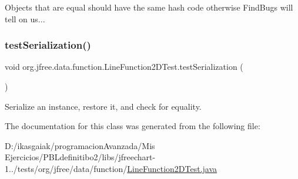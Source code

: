 Objects that are equal should have the same hash code otherwise Find\+Bugs will tell on us... \mbox{\label{classorg_1_1jfree_1_1data_1_1function_1_1_line_function2_d_test_a3b86dd173dec5104c02378b6553208ac}} 
\subsubsection{\texorpdfstring{test\+Serialization()}{testSerialization()}}
{\footnotesize\ttfamily void org.\+jfree.\+data.\+function.\+Line\+Function2\+D\+Test.\+test\+Serialization (\begin{DoxyParamCaption}{ }\end{DoxyParamCaption})}

Serialize an instance, restore it, and check for equality. 

The documentation for this class was generated from the following file\+:\begin{DoxyCompactItemize}
\item 
D\+:/ikasgaiak/programacion\+Avanzada/\+Mis Ejercicios/\+P\+B\+Ldefinitibo2/libs/jfreechart-\/1../tests/org/jfree/data/function/\mbox{\hyperlink{_line_function2_d_test_8java}{Line\+Function2\+D\+Test.\+java}}\end{DoxyCompactItemize}
